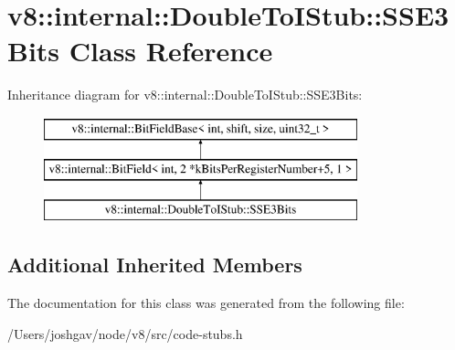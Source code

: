 \hypertarget{classv8_1_1internal_1_1_double_to_i_stub_1_1_s_s_e3_bits}{}\section{v8\+:\+:internal\+:\+:Double\+To\+I\+Stub\+:\+:S\+S\+E3\+Bits Class Reference}
\label{classv8_1_1internal_1_1_double_to_i_stub_1_1_s_s_e3_bits}
Inheritance diagram for v8\+:\+:internal\+:\+:Double\+To\+I\+Stub\+:\+:S\+S\+E3\+Bits\+:\begin{figure}[H]
\begin{center}
\leavevmode
\includegraphics[height=3.000000cm]{classv8_1_1internal_1_1_double_to_i_stub_1_1_s_s_e3_bits}
\end{center}
\end{figure}
\subsection*{Additional Inherited Members}


The documentation for this class was generated from the following file\+:\begin{DoxyCompactItemize}
\item 
/\+Users/joshgav/node/v8/src/code-\/stubs.\+h\end{DoxyCompactItemize}

